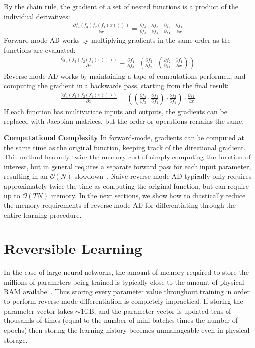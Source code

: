 \documentclass{article}
\newcommand{\pderiv}[2]{\frac{\partial #1}{\partial #2}}
\newcommand{\numhypers}{N}
\newcommand{\numsteps}{T}
\begin{document}
By the chain rule, the gradient of a set of nested functions is a product of the individual derivatives:
%
\begin{align*}
\pderiv{f_4(f_3(f_2(f_1(x))))}{x} = \pderiv{f_4}{f_3} \cdot \pderiv{f_3}{f_2} \cdot \pderiv{f_2}{f_1} \cdot \pderiv{f_1}{x}
\end{align*}
%
Forward-mode AD works by multiplying gradients in the same order as the functions are evaluated:
%
\begin{align*}
\pderiv{f_4(f_3(f_2(f_1(x))))}{x} = \pderiv{f_4}{f_3} \cdot \left( \pderiv{f_3}{f_2} \cdot \left( \pderiv{f_2}{f_1} \cdot \pderiv{f_1}{x} \right) \right)
\end{align*}
%
Reverse-mode AD works by maintaining a tape of computations performed, and computing the gradient in a backwards pass, starting from the final result:
%
\begin{align*}
\pderiv{f_4(f_3(f_2(f_1(x))))}{x} = \left(  \left(  \pderiv{f_4}{f_3} \cdot \pderiv{f_3}{f_2} \right) \cdot \pderiv{f_2}{f_1} \right) \cdot \pderiv{f_1}{x} 
\end{align*}
%
If each function has multivariate inputs and outputs, the gradients can be replaced with Jacobian matrices, but the order or operations remains the same.

\textbf{Computational Complexity}
In forward-mode, gradients can be computed at the same time as the original function, keeping track of the directional gradient.
This method has only twice the memory cost of simply computing the function of interest, but in general requires a separate forward pass for each input parameter, resulting in an $\mathcal{O}(\numhypers)$ slowdown~\cite{pearlmutter2008reverse}.
Naive reverse-mode AD typically only requires approximately twice the time as computing the original function, but can require up to $\mathcal{O}(\numsteps\numhypers)$ memory.
In the next sections, we show how to drastically reduce the memory requirements of reverse-mode AD for differentiating through the entire learning procedure.

\section{Reversible Learning}

In the case of large neural networks, the amount of memory required to store the millions of parameters being trained is typically close to the amount of physical RAM availabe~\cite{sequence2014}.
Thus storing every parameter value throughout training in order to perform reverse-mode differentiation is completely impractical.
If storing the parameter vector takes $\sim$1GB, and the parameter vector is updated tens of thousands of times (equal to the number of mini batches times the number of epochs) then storing the learning history becomes unmanageable even in physical storage.
\end{document}
